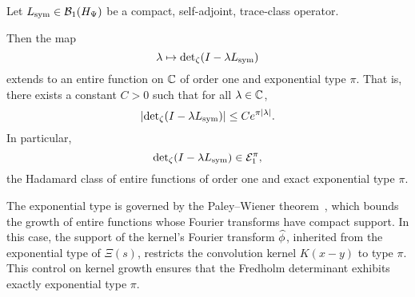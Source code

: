 \begin{lemma}
\label{lem:det_identity_entire_order_one}

Let \( L_{\mathrm{sym}} \in \mathcal{B}_1(H_{\Psi}) \) be a compact, self-adjoint, trace-class operator.

Then the map
\[
\lambda \mapsto \det\nolimits_\zeta(I - \lambda L_{\mathrm{sym}})
\]
extends to an entire function on \( \mathbb{C} \) of order one and exponential type \( \pi \). That is, there exists a constant \( C > 0 \) such that for all \( \lambda \in \mathbb{C} \),
\[
\left| \det\nolimits_\zeta(I - \lambda L_{\mathrm{sym}}) \right| \le C e^{\pi |\lambda|}.
\]
In particular,
\[
\det\nolimits_\zeta(I - \lambda L_{\mathrm{sym}}) \in \mathcal{E}_1^\pi,
\]
the Hadamard class of entire functions of order one and exact exponential type \( \pi \).

\medskip
\noindent
The exponential type is governed by the Paley--Wiener theorem~\cite[Ch.~9]{Levin1996EntireLectures}, which bounds the growth of entire functions whose Fourier transforms have compact support. In this case, the support of the kernel’s Fourier transform \( \widehat{\phi} \), inherited from the exponential type of \( \Xi(s) \), restricts the convolution kernel \( K(x - y) \) to type \( \pi \). This control on kernel growth ensures that the Fredholm determinant exhibits exactly exponential type \( \pi \).
\end{lemma}
